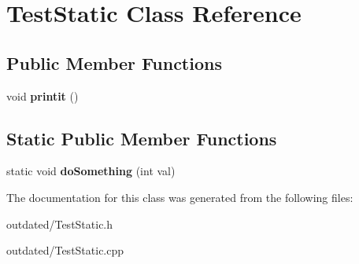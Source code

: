 \hypertarget{classTestStatic}{}\section{Test\+Static Class Reference}
\label{classTestStatic}
\subsection*{Public Member Functions}
\begin{DoxyCompactItemize}
\item 
void {\bfseries printit} ()\hypertarget{classTestStatic_af877b62beba36ec427f5a20cf0b261e5}{}\label{classTestStatic_af877b62beba36ec427f5a20cf0b261e5}

\end{DoxyCompactItemize}
\subsection*{Static Public Member Functions}
\begin{DoxyCompactItemize}
\item 
static void {\bfseries do\+Something} (int val)\hypertarget{classTestStatic_af09e079b702a6fba0a9623c136665d90}{}\label{classTestStatic_af09e079b702a6fba0a9623c136665d90}

\end{DoxyCompactItemize}


The documentation for this class was generated from the following files\+:\begin{DoxyCompactItemize}
\item 
outdated/Test\+Static.\+h\item 
outdated/Test\+Static.\+cpp\end{DoxyCompactItemize}
